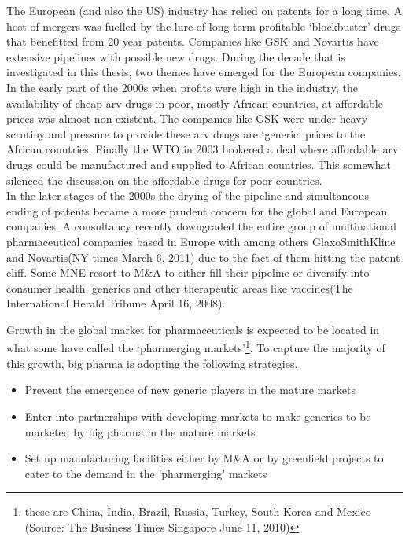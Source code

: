 The European (and also the US) \pharma industry has relied on patents for a long time.
A host of mergers was fuelled by the lure of long term profitable `blockbuster' drugs that benefitted from 20 year patents.
Companies like GSK and Novartis have extensive pipelines with possible new drugs.
During the decade that is investigated in this thesis, two themes have emerged for the European \pharma companies.
In the early part of the 2000s when profits were high in the \pharma industry, the availability of cheap \gls{arv} drugs in poor, mostly African countries, at affordable prices was almost non existent.
The \pharma companies like \gls{GSK} were under heavy scrutiny and pressure to provide these \gls{arv} drugs are `generic' prices to the African countries.
Finally the WTO in 2003 brokered a deal where affordable \gls{arv} drugs could be manufactured and supplied to African countries.
This somewhat silenced the discussion on the affordable drugs for poor countries.\\
In the later stages of the 2000s the drying of the pipeline and simultaneous ending of patents became a more prudent concern for the global and European \pharma companies. 
A consultancy recently downgraded the entire group of multinational pharmaceutical companies based in Europe with among others GlaxoSmithKline and Novartis(NY times March 6, 2011) due to the fact of them hitting the patent cliff.
Some MNE resort to M\&A to either fill their pipeline or diversify into consumer health, generics and other therapeutic areas like vaccines(The International Herald Tribune April 16, 2008).

Growth in the global market for pharmaceuticals is expected to be located in what some have called the `pharmerging markets'\footnote{these are China, India, Brazil, Russia, Turkey, South Korea and Mexico (Source: The Business Times Singapore June 11, 2010)}.
To capture the majority of this growth, big pharma is adopting the following strategies.
\begin{itemize}
\item Prevent the emergence of new generic players in the mature markets
\item Enter into partnerships with developing markets to make generics to be marketed by big pharma in the mature markets
\item Set up manufacturing facilities either by M\&A or by greenfield projects to cater to the demand in the 'pharmerging' markets
\end{itemize}

